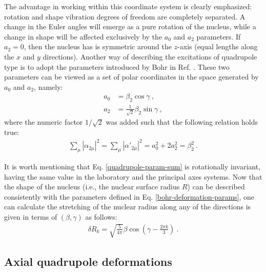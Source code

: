 The advantage in working within this coordinate system is clearly emphasized: rotation and shape vibration degrees of freedom are completely separated. A change in the Euler angles will emerge as a pure rotation of the nucleus, while a change in shape will be affected exclusively by the $a_0$ and $a_2$ parameters. If $a_2=0$, then the nucleus has is symmetric around the $z$-axis (equal lengths along the $x$ and $y$ directions). Another way of describing the excitations of quadrupole type is to adopt the parameters introduced by Bohr in Ref. \cite{bohr1954rotational}. These two parameters can be viewed as a set of polar coordinates in the space generated by $a_0$ and $a_2$, namely:
\begin{align}
    a_0&=\beta_2\cos\gamma\ , \nonumber \\
    a_2&=\frac{1}{\sqrt{2}}\beta_2\sin\gamma\ ,
    \label{bohr-deformation-params}
\end{align}
where the numeric factor $1/\sqrt{2}$ was added such that the following relation holds true:
\begin{align}
    \sum_\mu\left|\alpha_{2\mu}\right|^2=\sum_\mu\left|\alpha'_{2\mu}\right|^2=a_0^2+2a_2^2=\beta_2^2\ .
    \label{quadrupole-param-sum}
\end{align}

It is worth mentioning that Eq. \ref{quadrupole-param-sum} is rotationally invariant, having the same value in the laboratory and the principal axes systems. Now that the shape of the nucleus (i.e., the nuclear surface radius $R$) can be described consistently with the parameters defined in Eq. \ref{bohr-deformation-params}, one can calculate the stretching of the nuclear radius along any of the directions is given in terms of $(\beta,\gamma)$ as follows:
\begin{align}
    \delta R_k=\sqrt{\frac{5}{4\pi}}\beta\cos(\gamma-\frac{2\pi k}{3})\ .
    \label{axes-stretching}
\end{align}

\subsection{Axial quadrupole deformations}

